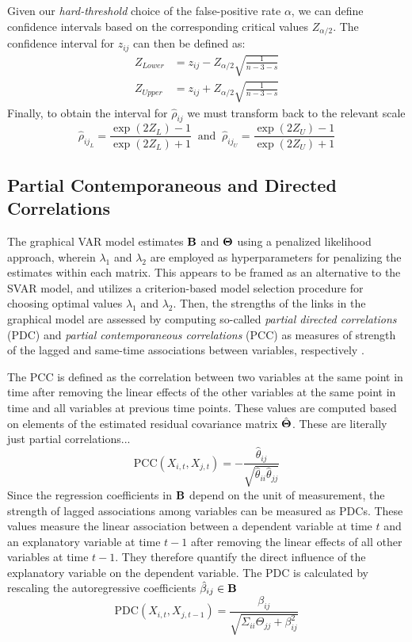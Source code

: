 Given our \textit{hard-threshold} choice of the false-positive rate $\alpha$, we can define confidence intervals based on the corresponding critical values $Z_{\alpha/2}$. The confidence interval for $z_{ij}$ can then be defined as:
\begin{equation}
    \begin{split}
        Z_{Lower} &= z_{ij} - Z_{\alpha/2} \sqrt{\frac{1}{n - 3 - s}} \\
        Z_{Upper} &= z_{ij} + Z_{\alpha/2} \sqrt{\frac{1}{n - 3 - s}}
    \end{split}
\end{equation}
Finally, to obtain the interval for $\hat{\rho}_{ij}$ we must transform back to the relevant scale
\begin{equation}
    \hat{\rho}_{ij_{L}} = \frac{\exp(2 Z_{L}) - 1}{\exp(2 Z_{L}) + 1} \;\; \text{and} \;\; \hat{\rho}_{ij_{U}} = \frac{\exp(2 Z_{U}) - 1}{\exp(2 Z_{U}) + 1}
\end{equation}

\subsection{Partial Contemporaneous and Directed Correlations}
The graphical VAR model estimates $\mathbf{B}$ and $\bm{\Theta}$ using a penalized likelihood approach, wherein $\lambda_1$ and $\lambda_2$ are employed as hyperparameters for penalizing the estimates within each matrix. This appears to be framed as an alternative to the SVAR model, and utilizes a criterion-based model selection procedure for choosing optimal values $\lambda_1$ and $\lambda_2$. Then, the strengths of the links in the graphical model are assessed by computing so-called \textit{partial directed correlations} (PDC) and \textit{partial contemporaneous correlations} (PCC) as measures of strength of the lagged and same-time associations between variables, respectively \cite{wild2010graphical}. 

The PCC is defined as the correlation between two variables at the same point in time after removing the linear effects of the other variables at the same point in time and all variables at previous time points. These values are computed based on elements of the estimated residual covariance matrix $\hat{\bm{\Theta}}$. These are literally just partial correlations...
\begin{equation}
    \text{PCC}(X_{i,t}, X_{j,t}) = - \frac{\hat{\theta}_{ij}}{\sqrt{\hat{\theta}_{ii} \hat{\theta}_{jj}}}
\end{equation}
Since the regression coefficients in $\mathbf{B}$ depend on the unit of measurement, the strength of lagged associations among variables can be measured as PDCs. These values measure the linear association between a dependent variable at time $t$ and an explanatory variable at time $t - 1$ after removing the linear effects of all other variables at time $t-1$. They therefore quantify the direct influence of the explanatory variable on the dependent variable. The PDC is calculated by rescaling the autoregressive coefficients $\hat{\beta}_{ij} \in \mathbf{B}$
\begin{equation}
    \text{PDC}(X_{i,t}, X_{j, t-1}) = \frac{\beta_{ij}}{\sqrt{\Sigma_{ii} \Theta_{jj} + \beta_{ij}^2}}
\end{equation}